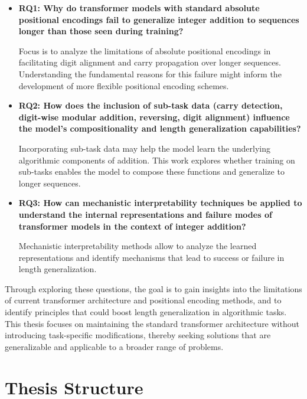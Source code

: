 \begin{itemize}
    \item \textbf{RQ1: Why do transformer models with standard absolute positional encodings fail to generalize integer addition to sequences longer than those seen during training?}
          
          Focus is to analyze the limitations of absolute positional encodings in facilitating digit alignment and carry propagation over longer sequences. Understanding the fundamental reasons for this failure might inform the development of more flexible positional encoding schemes.
          
    \item \textbf{RQ2: How does the inclusion of sub-task data (carry detection, digit-wise modular addition, reversing, digit alignment) influence the model's compositionality and length generalization capabilities?}
          
          Incorporating sub-task data may help the model learn the underlying algorithmic components of addition. This work explores whether training on sub-tasks enables the model to compose these functions and generalize to longer sequences.
          
    \item \textbf{RQ3: How can mechanistic interpretability techniques be applied to understand the internal representations and failure modes of transformer models in the context of integer addition?}
          
          Mechanistic interpretability methods allow to analyze the learned representations and identify mechanisms that lead to success or failure in length generalization.
          
\end{itemize}

Through exploring these questions, the goal is to gain insights into the limitations of current transformer architecture and positional encoding methods, and to identify principles that could boost length generalization in algorithmic tasks. This thesis focuses on maintaining the standard transformer architecture without introducing task-specific modifications, thereby seeking solutions that are generalizable and applicable to a broader range of problems.


\section{Thesis Structure}

